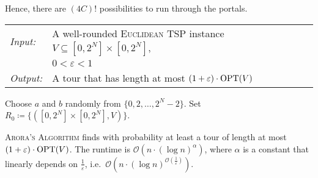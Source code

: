 \documentclass[../skript.tex]{subfiles}
\begin{document}
Hence, there are $(4C)!$ possibilities to run through the portals.
\begin{algorithmbox}
\begin{tabular}{@{}ll}
\textit{Input:} & A well-rounded \textsc{Euclidean TSP} instance $V \subseteq [0, 2^N] \times [0, 2^N]$, \\
& $0 < \varepsilon < 1$ \\
\textit{Output:} & A tour that has length at most $(1 + \varepsilon) \cdot \operatorname{OPT}(V)$
\end{tabular}
\end{algorithmbox}
\vspace{-7pt}
\begin{algorithm}[H]
Choose $a$ and $b$ randomly from $\{ 0, 2, \ldots, 2^N - 2 \}$.\;
Set $R_0 \coloneqq \{ ([0, 2^N] \times [0, 2^N], V) \}$.\;
\end{algorithm}
\vspace{-7pt}
\EndAlgorithmLine
\begin{theorem} %
\label{thm:97}
\textsc{Arora's Algorithm} finds with probability at least  a tour of length at most $(1 + \varepsilon) \cdot \operatorname{OPT}(V)$.
The runtime is $\mathcal{O}(n \cdot (\log n)^\alpha)$, where $\alpha$ is a constant that linearly depends on $\frac{1}{\varepsilon}$, i.e.\ $\mathcal{O}(n \cdot (\log n)^{\mathcal{O}\left( \frac{1}{\varepsilon} \right)})$.
\end{theorem}
\end{document}

